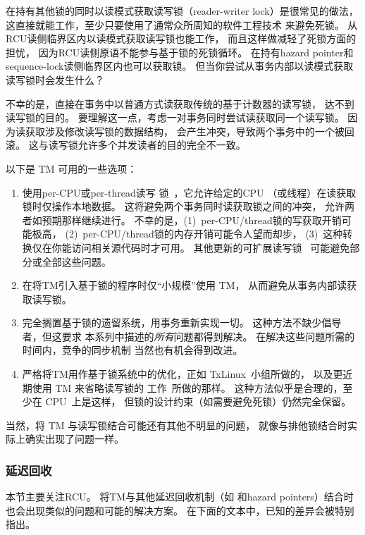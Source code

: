 在持有其他锁的同时以读模式获取读写锁（reader-writer lock）是很常见的做法，
这直接就能工作，至少只要使用了通常众所周知的软件工程技术
来避免死锁。
从RCU读侧临界区内以读模式获取读写锁也能工作，
而且这样做减轻了死锁方面的担忧，
因为RCU读侧原语不能参与基于锁的死锁循环。
在持有hazard pointer和sequence-lock读侧临界区内也可以获取锁。
但当你尝试从事务内部以读模式获取读写锁时会发生什么？

不幸的是，直接在事务中以普通方式读获取传统的基于计数器的读写锁，
达不到读写锁的目的。
要理解这一点，考虑一对事务同时尝试读获取同一个读写锁。
因为读获取涉及修改读写锁的数据结构，
会产生冲突，导致两个事务中的一个被回滚。
这与读写锁允许多个并发读者的目的完全不一致。

以下是 TM 可用的一些选项：

\begin{enumerate}
\item	使用per-CPU或per-thread读写
	锁~\cite{WilsonCHsieh92a}，它允许给定的CPU
	（或线程）在读获取锁时仅操作本地数据。
	这将避免两个事务同时读获取锁之间的冲突，
	允许两者如预期那样继续进行。
	不幸的是，(1)~per-CPU/thread锁的写获取开销可能极高，
	(2)~per-CPU/thread锁的内存开销可能令人望而却步，
	(3)~这种转换仅在你能访问相关源代码时才可用。
	其他更新的可扩展读写锁~\cite{YossiLev2009SNZIrwlock}
	可能避免部分或全部这些问题。
\item	在将TM引入基于锁的程序时仅``小规模''使用 TM，
	从而避免从事务内部读获取读写锁。
\item	完全搁置基于锁的遗留系统，用事务重新实现一切。
	这种方法不缺少倡导者，但这要求
	本系列中描述的\emph{所有}问题都得到解决。
	在解决这些问题所需的时间内，竞争的同步机制
	当然也有机会得到改进。
\item	严格将TM用作基于锁系统中的优化，正如
	TxLinux~\cite{ChistopherJRossbach2007a}小组所做的，
	以及更近期使用 TM 来省略读写锁的
	工作~\cite{PascalFelber2016rwlockElision}所做的那样。
	这种方法似乎是合理的，至少在
	CPU~\cite{Le:2015:TMS:3266491.3266500}上是这样，
	但锁的设计约束（如需要避免死锁）仍然完全保留。
\end{enumerate}

当然，将 TM 与读写锁结合可能还有其他不明显的问题，
就像与排他锁结合时实际上确实出现了问题一样。

\subsubsection{延迟回收}
\label{sec:future:Deferred Reclamation}

本节主要关注RCU。
将TM与其他延迟回收机制（如
和hazard pointers）结合时也会出现类似的问题和可能的解决方案。
在下面的文本中，已知的差异会被特别指出。

